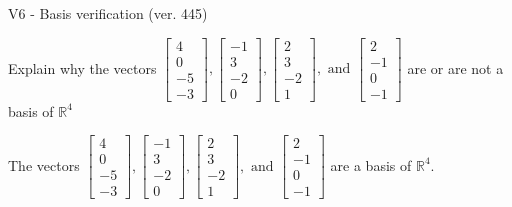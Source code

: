 \begin{exercise}
  \begin{exerciseTitle}V6 - Basis verification (ver. 445)\end{exerciseTitle}
  \begin{exerciseStatement}
    Explain why the vectors \(\left[\begin{array}{r}
4 \\
0 \\
-5 \\
-3
\end{array}\right] , \left[\begin{array}{r}
-1 \\
3 \\
-2 \\
0
\end{array}\right] , \left[\begin{array}{r}
2 \\
3 \\
-2 \\
1
\end{array}\right] , \text{ and } \left[\begin{array}{r}
2 \\
-1 \\
0 \\
-1
\end{array}\right]\) are or are not a basis of \(\mathbb{R}^4\)	


  \end{exerciseStatement}
  \begin{exerciseAnswer}
   The vectors \(\left[\begin{array}{r}
4 \\
0 \\
-5 \\
-3
\end{array}\right] , \left[\begin{array}{r}
-1 \\
3 \\
-2 \\
0
\end{array}\right] , \left[\begin{array}{r}
2 \\
3 \\
-2 \\
1
\end{array}\right] , \text{ and } \left[\begin{array}{r}
2 \\
-1 \\
0 \\
-1
\end{array}\right]\) 
  	 are  a basis of \(\mathbb{R}^4\).
  


  \end{exerciseAnswer}
\end{exercise}